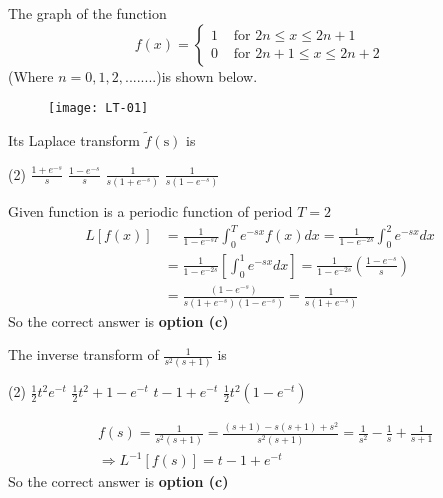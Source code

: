 \begin{exercise}
	The graph of the function
	$$f(x)= \begin{cases}1 & \text { for } 2 n \leq x \leq 2 n+1 \\ 0 & \text { for } 2 n+1 \leq x \leq 2 n+2\end{cases}$$
	(Where $n=0,1,2,........$)is shown below.
	\begin{figure}[H]
		\centering
		\texttt{[image: LT-01]}
	\end{figure}
	Its Laplace transform $\tilde{f}(\mathrm{s})$ is
	 \begin{tasks}(2)
		\task[\textbf{a.}]$\frac{1+e^{-s}}{s}$
		\task[\textbf{b.}]$\frac{1-e^{-s}}{s}$
		\task[\textbf{c.}]$\frac{1}{s\left(1+e^{-s}\right)}$
		\task[\textbf{d.}]  $\frac{1}{s\left(1-e^{-s}\right)}$
	\end{tasks}
\end{exercise}
\begin{answer}
	Given function is a periodic function of period $T=2$
	\begin{align*}
	L[f(x)] &=\frac{1}{1-e^{-s T}} \int_{0}^{T} e^{-s x} f(x) d x=\frac{1}{1-e^{-2 s}} \int_{0}^{2} e^{-s x} d x \\
	&=\frac{1}{1-e^{-2 s}}\left[\int_{0}^{1} e^{-s x} d x\right]=\frac{1}{1-e^{-2 s}}\left(\frac{1-e^{-s}}{s}\right) \\
	&=\frac{\left(1-e^{-s}\right)}{s\left(1+e^{-s}\right)\left(1-e^{-s}\right)}=\frac{1}{s\left(1+e^{-s}\right)}
	\end{align*}
	So the correct answer is \textbf{option (c)}
\end{answer}
\begin{exercise}
	The inverse transform of $\frac{1}{s^2(s+1)}$ is
	 \begin{tasks}(2)
		\task[\textbf{a.}]$\frac{1}{2} t^{2} e^{-t}$
		\task[\textbf{b.}]$\frac{1}{2} t^{2}+1-e^{-t}$
		\task[\textbf{c.}]$t-1+e^{-t}$
		\task[\textbf{d.}] $\frac{1}{2} t^{2}\left(1-e^{-t}\right)$ 
	\end{tasks}
\end{exercise}
\begin{answer}
	\begin{align*}
	&f(s)=\frac{1}{s^{2}(s+1)}=\frac{(s+1)-s(s+1)+s^{2}}{s^{2}(s+1)}=\frac{1}{s^{2}}-\frac{1}{s}+\frac{1}{s+1} \\
	&\Rightarrow L^{-1}[f(s)]=t-1+e^{-t}
	\end{align*}
		So the correct answer is \textbf{option (c)}
\end{answer}
